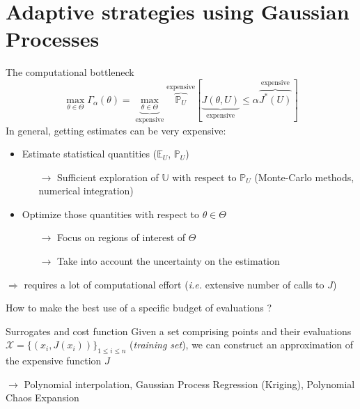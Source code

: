 \documentclass[10pt,aspectratio=169,usepdftitle=false]{beamer}
\newcommand{\Uspace}{\mathbb{U}}
\newcommand{\Kspace}{\Theta}
\newcommand{\Ex}{\mathbb{E}}
\newcommand{\Prob}{\mathbb{P}}
\newcommand{\kk}{\theta}
\newcommand{\UU}{U}
\begin{document}
\section{Adaptive strategies using Gaussian Processes}
\begin{frame}{The computational bottleneck}
  \begin{equation}
  \max_{\kk\in\Kspace}\Gamma_{\alpha}(\kk) = \underbrace{\max_{\kk\in\Kspace}}_{\text{expensive}}\overbrace{\Prob_{\UU}}^{\text{expensive}}[\underbrace{J(\kk, \UU)}_{\text{expensive}} \leq \alpha \overbrace{J^*(\UU)}^{\text{expensive}}]
\end{equation}
  In general, getting estimates can be very expensive:
  \begin{itemize}
  \item \alert{Estimate} statistical quantities ($\Ex_{\UU}$, $\Prob_{\UU}$)
    \begin{itemize}
    \item[$\rightarrow$] Sufficient exploration of $\Uspace$ with
      respect to $\Prob_{\UU}$ (Monte-Carlo methods, numerical
      integration)
 \end{itemize}
\item \alert{Optimize} those quantities with respect to $\kk\in\Kspace$
  \begin{itemize}
  \item[$\rightarrow$] Focus on regions of interest of $\Kspace$
  \item[$\rightarrow$] Take into account the uncertainty on the estimation
  \end{itemize}
    \end{itemize}
    $\Rightarrow$ requires a lot of computational effort (\emph{i.e.} extensive number of calls to $J$)

    How to make the best use of a specific budget of evaluations ?
\end{frame}

\begin{frame}{Surrogates and cost function}
  Given a set comprising points and their evaluations
  $\mathcal{X} = \{(x_i,J(x_i))\}_{1 \leq i \leq n}$ (\textit{training set}), we can construct
  an \alert{approximation} of the expensive function $J$

  
  $\rightarrow$ Polynomial interpolation, \alert<2>{Gaussian Process Regression (Kriging)}, Polynomial Chaos Expansion
\end{frame}
\end{document}
